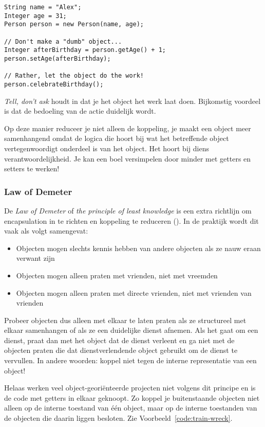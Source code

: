 \begin{listing}[H]
\begin{verbatim}
String name = "Alex";
Integer age = 31;
Person person = new Person(name, age);

// Don't make a "dumb" object...
Integer afterBirthday = person.getAge() + 1;
person.setAge(afterBirthday);

// Rather, let the object do the work!
person.celebrateBirthday();
\end{verbatim}
\caption{\textit{Tell, don't ask} houdt in dat je het object het werk laat doen.
Bijkomstig voordeel is dat de bedoeling van de actie duidelijk wordt.}
\label{code:tell-dont-ask}
\end{listing}

Op deze manier reduceer je niet alleen de koppeling, 
je maakt een object meer samenhangend omdat de logica 
die hoort bij wat het betreffende object vertegenwoordigt
onderdeel is van het object. Het hoort bij diens verantwoordelijkheid.
Je kan een boel versimpelen door minder met getters en setters te werken!

\subsubsection{Law of Demeter}
De \textit{Law of Demeter} of \textit{the principle of least knowledge} 
is een extra richtlijn om encapsulation in te richten en koppeling te reduceren
(\cite{Lieberherr1989}). In de praktijk wordt dit vaak als volgt samengevat:

\begin{itemize}
    \item Objecten mogen slechts kennis hebben van andere objecten als ze nauw eraan verwant zijn
    \item Objecten mogen alleen praten met vrienden, niet met vreemden
    \item Objecten mogen alleen praten met directe vrienden, niet met vrienden van vrienden
\end{itemize}

Probeer objecten dus alleen met elkaar te laten praten als ze 
structureel met elkaar samenhangen of als ze een duidelijke dienst afnemen.
Als het gaat om een dienst, praat dan met het object dat de dienst verleent 
en ga niet met de objecten praten die dat dienstverlendende object gebruikt om
de dienst te vervullen. 
In andere woorden: koppel niet tegen de interne representatie van een object!

Helaas werken veel object-georiënteerde projecten niet volgens dit principe en 
is de code met getters in elkaar geknoopt. 
Zo koppel je buitenstaande objecten niet alleen op de 
interne toestand van één object, maar op de interne toestanden van 
de objecten die daarin liggen besloten. Zie Voorbeeld~\ref{code:train-wreck}.

